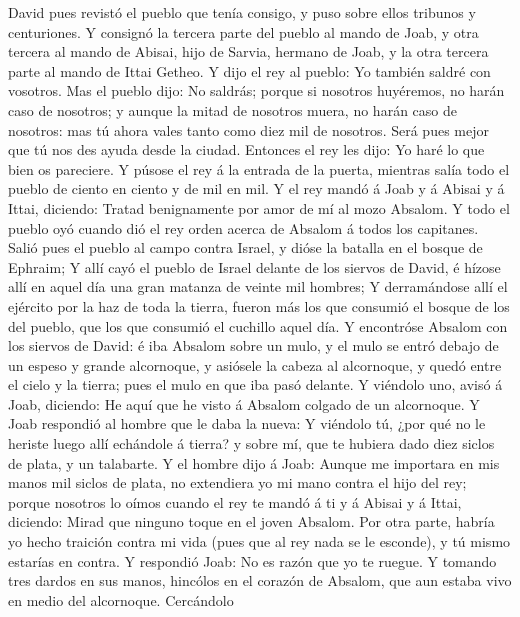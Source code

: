  David pues revistó el pueblo que tenía consigo, y puso
sobre ellos tribunos y centuriones.  Y consignó la tercera
parte del pueblo al mando de Joab, y otra tercera al mando de Abisai,
hijo de Sarvia, hermano de Joab, y la otra tercera parte al mando de
Ittai Getheo. Y dijo el rey al pueblo: Yo también saldré con vosotros.
 Mas el pueblo dijo: No saldrás; porque si nosotros
huyéremos, no harán caso de nosotros; y aunque la mitad de nosotros
muera, no harán caso de nosotros: mas tú ahora vales tanto como diez mil
de nosotros. Será pues mejor que tú nos des ayuda desde la ciudad.
 Entonces el rey les dijo: Yo haré lo que bien os
pareciere. Y púsose el rey á la entrada de la puerta, mientras salía
todo el pueblo de ciento en ciento y de mil en mil.  Y el
rey mandó á Joab y á Abisai y á Ittai, diciendo: Tratad benignamente por
amor de mí al mozo Absalom. Y todo el pueblo oyó cuando dió el rey orden
acerca de Absalom á todos los capitanes.  Salió pues el
pueblo al campo contra Israel, y dióse la batalla en el bosque de
Ephraim;  Y allí cayó el pueblo de Israel delante de los
siervos de David, é hízose allí en aquel día una gran matanza de veinte
mil hombres;  Y derramándose allí el ejército por la haz
de toda la tierra, fueron más los que consumió el bosque de los del
pueblo, que los que consumió el cuchillo aquel día.  Y
encontróse Absalom con los siervos de David: é iba Absalom sobre un
mulo, y el mulo se entró debajo de un espeso y grande alcornoque, y
asiósele la cabeza al alcornoque, y quedó entre el cielo y la tierra;
pues el mulo en que iba pasó delante.  Y viéndolo uno,
avisó á Joab, diciendo: He aquí que he visto á Absalom colgado de un
alcornoque.  Y Joab respondió al hombre que le daba la
nueva: Y viéndolo tú, ¿por qué no le heriste luego allí echándole á
tierra? y sobre mí, que te hubiera dado diez siclos de plata, y un
talabarte.  Y el hombre dijo á Joab: Aunque me importara
en mis manos mil siclos de plata, no extendiera yo mi mano contra el
hijo del rey; porque nosotros lo oímos cuando el rey te mandó á ti y á
Abisai y á Ittai, diciendo: Mirad que ninguno toque en el joven Absalom.
 Por otra parte, habría yo hecho traición contra mi vida
(pues que al rey nada se le esconde), y tú mismo estarías en contra.
 Y respondió Joab: No es razón que yo te ruegue. Y
tomando tres dardos en sus manos, hincólos en el corazón de Absalom, que
aun estaba vivo en medio del alcornoque.  Cercándolo
